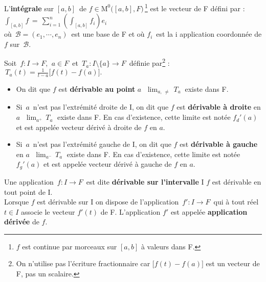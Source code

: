 \noindent L'\textbf{intégrale} sur \([a,b]\,\) de \(f\in\text{M}^0\bigl([a,b],F\bigr)\,\)\footnote{$f$ est continue par morceaux sur $[a,b]$ à valeurs dans F.} est le vecteur de F défini par :
\(\displaystyle \int_{[a,b]}\!\!f\,=\,\sum_{i=1}^{n}\!\left(\int_{[a,b]}\!\!f_i\right)\!e_i\)\vspace{0.3cm}\\
où \(\,\mathcal{B}=(e_1,\cdots,e_n)\,\) est une base de F et où $f_i\,$ est la i application coordonnée de $f$ sur \(\,\mathcal{B}.\)

\vspace{2.3cm}

\noindent Soit \(\,f:I\to F,\ \,a\in F\,\) et \(\,T_a:I\setminus\! \{a\}\to F\,\) définie par\footnote{On n'utilise pas l'écriture fractionnaire car \(\bigl[f(t)-f(a)\bigr]\) est un vecteur de F, pas un scalaire. } : \(\,\displaystyle T_a(t)=\frac{1}{t-a}\bigl[f(t)-f(a)\bigr].\)\vspace{0.1cm}
\begin{itemize}[leftmargin=1cm, label=•]
    \item On dit que $f$ est \textbf{dérivable au point} $a$ \ssi \(\;\displaystyle \lim_{a,\,\neq}\,T_a\:\) existe dans F.
    
    \item Si $\,a\,$ n'est pas l'extrémité droite de I, on dit que $f$ est \textbf{dérivable à droite} en $a$ \ssi \(\;\displaystyle \lim_{a^+}\,T_a\;\) existe dans F. En cas d'existence, cette limite est notée \(f_d'(a)\) et est appelée vecteur dérivé à droite de $f$ en $a$.
    
    \item Si $\,a\,$ n'est pas l'extrémité gauche de I, on dit que $f$ est \textbf{dérivable à gauche} en $a$ \ssi \(\;\displaystyle \lim_{a^-}\,T_a\;\) existe dans F. En cas d'existence, cette limite est notée \(f_g'(a)\) et est appelée vecteur dérivé à gauche de $f$ en $a$.
\end{itemize}

\vspace{1.5cm}

Une application \(\,f:I\to F\,\) est dite \textbf{dérivable sur l'intervalle} I \ssi $f$ est dérivable en tout point de I.\\
Lorsque $f$ est dérivable sur I on dispose de l'application \(\, f':I\to F\,\) qui à tout réel \(t\in I\) associe le vecteur \(f'(t)\) de F. L'application $f'$ est appelée \textbf{application dérivée} de $f$.

